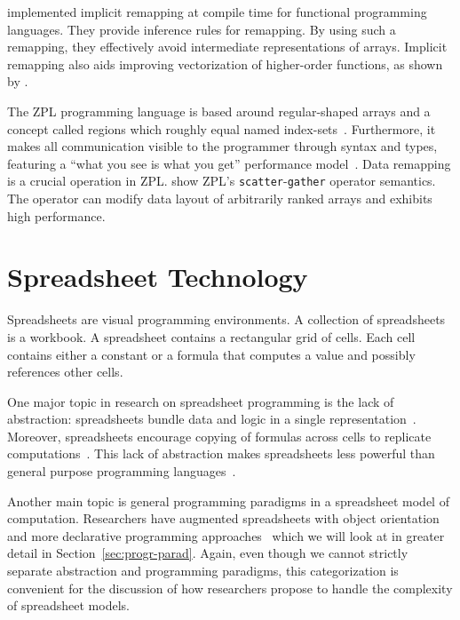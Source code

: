 \documentclass[a4paper]{article}
\begin{document}
\citet{Walinsky:1990:FPL:91556.91610} implemented implicit remapping
at compile time for functional programming languages. They provide
inference rules for remapping. By using such a remapping, they
effectively avoid intermediate representations of arrays. Implicit
remapping also aids improving vectorization of higher-order functions,
as shown by \citet{Sinkarovs:2013:SDL:2502323.2502332}.

The ZPL programming language is based around regular-shaped arrays and
a concept called regions which roughly equal named
index-sets~\cite{Chamberlain1999Regions}. Furthermore, it makes all
communication visible to the programmer through syntax and types,
featuring a ``what you see is what you get'' performance
model~\cite{Chamberlain1998ZPLs}. Data remapping is a crucial
operation in ZPL.\@ \citet{Deitz:2003:DIP:781498.781526} show ZPL's
\texttt{scatter}-\texttt{gather} operator semantics. The operator can
modify data layout of arbitrarily ranked arrays and exhibits high
performance.

\section{Spreadsheet Technology}
\label{sec:spreadsheet-end-user-dev}

Spreadsheets are visual programming environments. A collection of
spreadsheets is a workbook. A spreadsheet contains a rectangular grid
of cells. Each cell contains either a constant or a formula that
computes a value and possibly references other cells.

One major topic in research on spreadsheet programming is the lack of
abstraction: spreadsheets bundle data and logic in a single
representation~\cite{Isakowitz:1995:TLT:195705.195708}. Moreover,
spreadsheets encourage copying of formulas across cells to replicate
computations~\cite{1173080, Benfield:2009:FFD:1668113.1668121}. This
lack of abstraction makes spreadsheets less powerful than general
purpose programming languages~\cite{Miller:2015:SPB:2814189.2814201}.

Another main topic is general programming paradigms in a spreadsheet
model of computation. Researchers have augmented spreadsheets with
object orientation~\cite{Benfield:2009:FFD:1668113.1668121} and more
declarative programming
approaches~\cite{Stadelmann:1993:SBC:168642.168664,
  Singh:2016:TSD:2837614.2837668} which we will look at in greater
detail in Section~\ref{sec:progr-parad}. Again, even though we cannot
strictly separate abstraction and programming paradigms, this
categorization is convenient for the discussion of how researchers
propose to handle the complexity of spreadsheet models.
\end{document}
